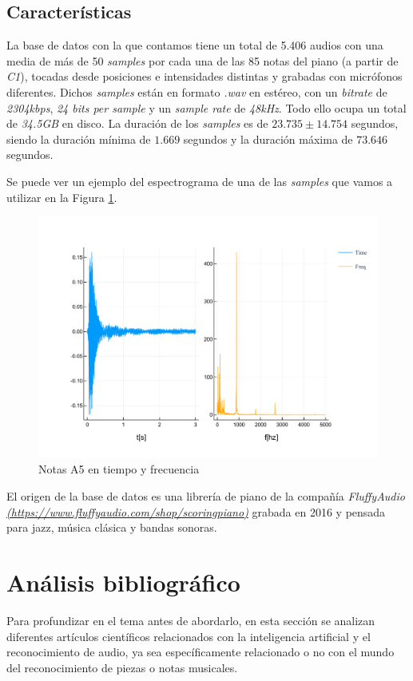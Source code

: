 \documentclass[12pt]{article}
\begin{document}
\subsection{Características}
\bigskip
La base de datos con la que contamos tiene un total de 5.406 audios con una media de más de 50 \textit{samples} por cada una de las 85 notas del piano (a partir de \textit{C1}), tocadas
desde posiciones e intensidades distintas y grabadas con micrófonos diferentes. Dichos \textit{samples} están en formato \textit{.wav} en estéreo, con un 
\textit{bitrate} de \textit{2304kbps}, \textit{24 bits per sample} y un \textit{sample rate} de \textit{48kHz}. Todo ello ocupa un total de \textit{34.5GB} en disco.
La duración de los \textit{samples} es de  $23.735 \pm 14.754$ segundos, siendo la duración mínima
de $1.669$ segundos y la duración máxima de $73.646$ segundos.

Se puede ver un ejemplo del espectrograma de una de las \textit{samples} que vamos a utilizar en la Figura 
\ref{fig:espectro}.

\begin{figure}[!ht]
	\centering
	\includegraphics[width=1.0\linewidth]{assets/A5.pdf}
	\caption{Notas A5 en tiempo y frecuencia}
	\label{fig:espectro}
\end{figure}

\bigskip
El origen de la base de datos es una librería de piano de la compañía \textit{FluffyAudio} \textit{\url{(https://www.fluffyaudio.com/shop/scoringpiano)}} 
grabada en 2016 y pensada para jazz, música clásica y bandas sonoras.

\section{Análisis bibliográfico}
\label{Análisis bibliográfico}
Para profundizar en el tema antes de abordarlo, en esta sección se analizan diferentes artículos científicos relacionados con la inteligencia
artificial y el reconocimiento de audio, ya sea específicamente relacionado o no con el mundo del reconocimiento de piezas o notas musicales.
\end{document}
